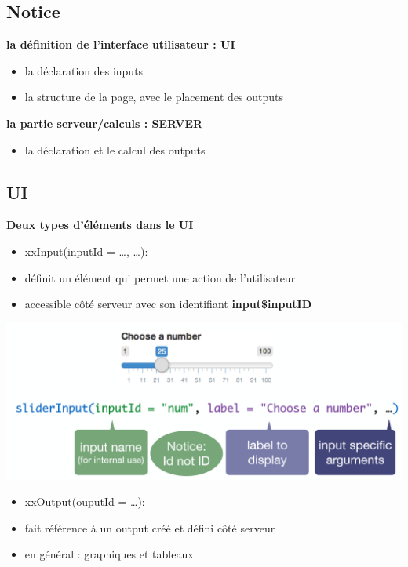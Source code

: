 \documentclass[]{article}
\providecommand{\tightlist}{%
  \setlength{\itemsep}{0pt}\setlength{\parskip}{0pt}}
\begin{document}
\subsection{Notice}\label{notice}

\textbf{la définition de l'interface utilisateur : UI}

\begin{itemize}
\tightlist
\item
  la déclaration des inputs
\item
  la structure de la page, avec le placement des outputs
\end{itemize}

\textbf{la partie serveur/calculs : SERVER}

\begin{itemize}
\tightlist
\item
  la déclaration et le calcul des outputs
\end{itemize}

\subsection{UI}\label{ui}

\textbf{Deux types d'éléments dans le UI}

\begin{itemize}
\item
  xxInput(inputId = \ldots{}, \ldots{}):
\item
  définit un élément qui permet une action de l'utilisateur
\item
  accessible côté serveur avec son identifiant \textbf{input\$inputID}
\end{itemize}

\includegraphics{img/xxInput.png}

\begin{itemize}
\item
  xxOutput(ouputId = \ldots{}):
\item
  fait référence à un output créé et défini côté serveur
\item
  en général : graphiques et tableaux
\end{itemize}
\end{document}
